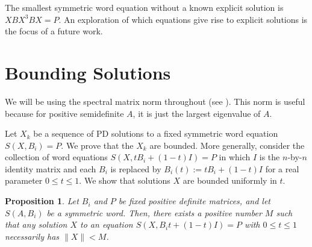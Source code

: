 \documentclass{amsart}
\newtheorem{prop}[thm]{Proposition}
\theoremstyle{definition}
\theoremstyle{remark}
\numberwithin{equation}{section}
\newcommand{\<}{\langle}
\renewcommand{\>}{\rangle}
\begin{document}
The smallest symmetric word equation without a known explicit solution is $XBX^3BX = P$.  An exploration of which equations give rise to explicit solutions is the focus of a future work.

\section{Bounding Solutions}

We will be using the spectral matrix norm throughout (see \cite[p.
295]{HJ1}).  This norm is useful because for positive semidefinite
$A$, it is just the largest eigenvalue of $A$.

Let $X_k$ be a sequence of PD solutions to a fixed symmetric word
equation $S(X,B_i) = P$.  We prove that the $X_k$ are bounded.  More
generally, consider the collection of word equations
$S(X,tB_i+(1-t)I) = P$ in which $I$ is the $n$-by-$n$ identity matrix and each $B_i$ is replaced by $B_i(t) := tB_i+(1-t)I$ for a real parameter $0 \leq t \leq
1$.  We show that solutions $X$ are bounded uniformly in $t$.

\begin{prop}\label{boundprop}
Let $B_i$ and $P$ be fixed positive definite matrices, and let $S(A,B_i)$ be a symmetric word.  Then, there exists a positive number $M$ such that any solution $X$ to an
equation $S(X,B_it+(1-t)I) = P$ with $0 \leq t \leq 1$
necessarily has $\|X\| < M$.
\end{prop}
\end{document}
